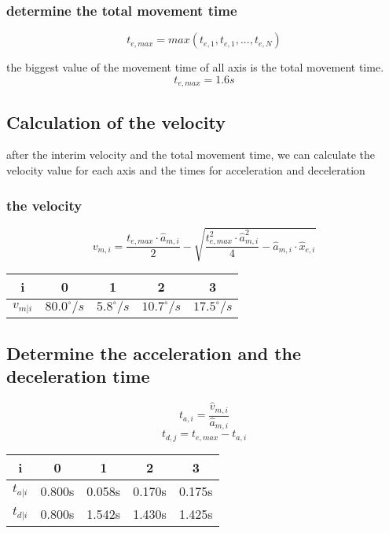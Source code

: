 \documentclass[professionalfonts, 
               xcolor={ usenames, %
                        dvipsnames,%
                        svgnames,%
                        table,%
                        hyperref%
                      }
              ]{beamer}
\begin{document}
\subsubsection*{determine the total movement time}
\begin{frame}
\begin{equation*}
t_{e,max} = max(t_{e,1},t_{e,1},...,t_{e,N})
\end{equation*}

the biggest value of the movement time of all axis is the total movement time.
\begin{equation*}
t_{e,max} = 1.6s
\end{equation*}    

\subsection{Calculation of the velocity }
after the interim velocity and the total movement time, we can calculate the velocity value for each axis and the times for acceleration and deceleration

\subsubsection*{the velocity}
\begin{equation*}
v_{m,i} = \frac{t_{e,max} \cdot \hat{a}_{m,i}}{2}-\sqrt{\frac{t_{e,max}^2 \cdot \hat{a}_{m,i}^2}{4}-\hat{a}_{m,i}\cdot \hat{x}_{e,i}}
\end{equation*}

\begin{center}
\begin{tabular}{ccccc}
\toprule
i & 0 & 1 & 2 & 3 \\
\midrule
$v_{m|i}$  & $80.0^\circ/s$   & $5.8^\circ/s$   & $10.7^\circ/s$  & $17.5^\circ/s$ \\
\bottomrule 
\end{tabular}
\end{center}
\end{frame}

\subsection{Determine the acceleration and the deceleration time}
\begin{frame}
\begin{equation*}
t_{a,i} = \frac{\hat{v}_{m,i}}{\hat{a}_{m,i}}
\end{equation*}
\begin{equation*}
t_{d,j} = t_{e,max}-t_{a,i}
\end{equation*}    

\begin{center}
\begin{tabular}{ccccc}
\toprule
i & 0 & 1 & 2 & 3 \\
\midrule
$t_{a|i}$ & 0.800s & 0.058s & 0.170s & 0.175s \\ 
$t_{d|i}$ & 0.800s & 1.542s & 1.430s & 1.425s \\
\bottomrule
\end{tabular}
\end{center}
\end{frame}
\end{document}
